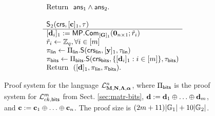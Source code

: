 \begin{figure}
\begin{\algSize}
$$\begin{array}{l}
\begin{array}{l}
\text{Return } \ \mathsf{ans}_1\wedge\mathsf{ans}_2.
\\
\\
\end{array}
\\
\begin{array}{l}
{\mathsf{S}_2(\mathsf{crs},[\mathbf{c}]_1,\tau)}\\
\hline
{[\mathbf{d}_i]_1} := \mathsf{MP}.\mathsf{Com}_{[\mathbf{{G}}]_1}(\mathbf{{0}}_{n\times 1};\tilde{{r}}_i)\\
\tilde{{r}}_i\gets\mathbb{Z}_q, \forall i\in[{m}]\\
\pi_{\mathsf{lin}} \gets 
    \Pi_{\mathsf{lin}}.\mathsf{S}
    (
        \mathsf{crs}_{\mathsf{lin}},
            [\mathbf{y}]_1,
       \tau_{\mathsf{lin}}
    )\\
\pi_{\mathsf{bits}} \gets
    \Pi_{\mathsf{bits}}.\mathsf{S}
    (
        \mathsf{crs}_{\mathsf{bits}},\{[\mathbf{d}_i]_1:i\in[{m}]\},
        \tau_{\mathsf{bits}}
    )\\
\text{Return } \  ([\mathbf{d}]_1,\pi_{\mathsf{lin}},\pi_{\mathsf{bits}}). \\
\end{array}
\end{array}$$
\end{\algSize}
\caption{Proof system for the language $\mathcal{L}_{\mathbf{{M}},\mathbf{{N}},\mathbf{{\Lambda}},{\boldsymbol \alpha}}^n$, where $\Pi_{\mathsf{bits}}$ is the proof system for $\mathcal{L}_{ck,\mathsf{bits}}^m$ from Sect. \ref{sec:matr-bits}, $\mathbf{d}:=\mathbf{d}_1\oplus\ldots\oplus\mathbf{d}_{m}$, and $\mathbf{c}:=\mathbf{c}_1\oplus\ldots\oplus\mathbf{c}_n$. The proof size is $(2{m}+11)|\mathbb{G}_1|+10|\mathbb{G}_2|$.\label{fig:bin-leng-nizk}}
\end{figure}

